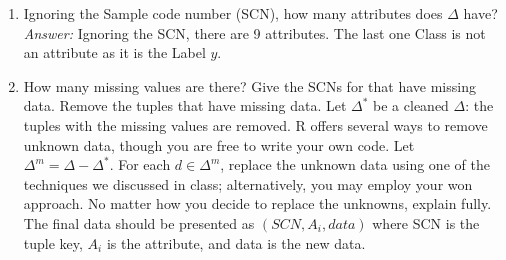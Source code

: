 \documentclass{article}
\begin{document}
\begin{enumerate}
\begin{enumerate}
	\end{enumerate}
	\item Ignoring the Sample code number (SCN), how many attributes does $\Delta$ have?\\
	\emph{Answer:} Ignoring the SCN, there are 9 attributes. The last one Class is not an attribute as it is the Label $y$.

	\item How many missing values are there? Give the SCNs for that have missing data. Remove the tuples that have missing data. Let $\Delta^{*}$  be a cleaned $\Delta$: the tuples with the missing values are removed. R offers several ways to remove unknown data, though you are free to write your own code. Let $\Delta^{m}= \Delta - \Delta^{*}$. For each $d \in \Delta^{m}$, replace the unknown data using one of the techniques we discussed in class; alternatively, you may employ your won approach. No matter how you decide to replace the unknowns, explain fully. The final data should be presented as $(SCN,A_{i}, data)$ where SCN is the tuple key, $A_i$ is the attribute, and data is the new data.\\



\end{enumerate}
\end{document}
